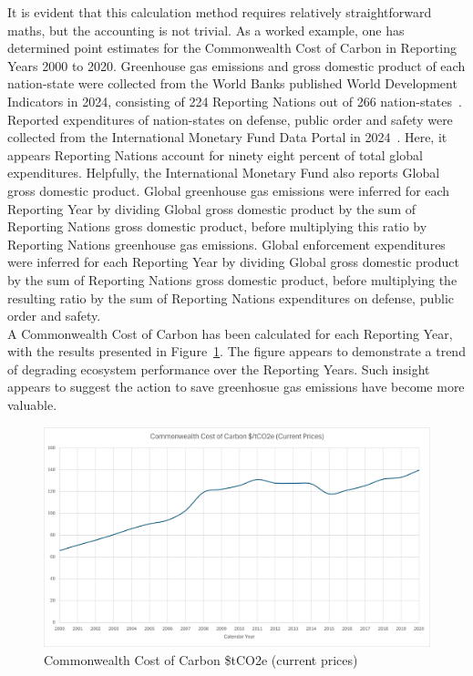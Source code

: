 \documentclass[11pt, oneside]{article}   	%
\begin{document}
It is evident that this calculation method requires relatively straightforward maths, but the accounting is not trivial.
As a worked example, one has determined point estimates for the Commonwealth Cost of Carbon in Reporting Years 2000 to 2020.
Greenhouse gas emissions and gross domestic product of each nation-state were collected from the World Banks published World Development Indicators in 2024, consisting of 224 Reporting Nations out of 266 nation-states~\cite{wbank}.
Reported expenditures of nation-states on defense, public order and safety were collected from the International Monetary Fund Data Portal in 2024~\cite{imf}.
Here, it appears Reporting Nations account for ninety eight percent of total global expenditures.
Helpfully, the International Monetary Fund also reports Global gross domestic product.
Global greenhouse gas emissions were inferred for each Reporting Year by dividing Global gross domestic product by the sum of Reporting Nations gross domestic product, before multiplying this ratio by Reporting Nations greenhouse gas emissions.
Global enforcement expenditures were inferred for each Reporting Year by dividing Global gross domestic product by the sum of Reporting Nations gross domestic product, before multiplying the resulting ratio by the sum of Reporting Nations expenditures on defense, public order and safety.\\

A Commonwealth Cost of Carbon has been calculated for each Reporting Year, with the results presented in Figure~\ref{CCC figure}.
The figure appears to demonstrate a trend of degrading ecosystem performance over the Reporting Years.
Such insight appears to suggest the action to save greenhosue gas emissions have become more valuable.\\

\begin{figure}[H]
\centering
\includegraphics[width=1\textwidth]{ccc}
\caption{Commonwealth Cost of Carbon \$tCO2e (current prices)}
\label{CCC figure}
\end{figure}
\end{document}

